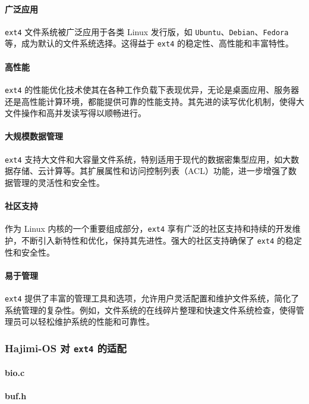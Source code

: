 \documentclass[UTF8]{article}
\begin{document}
\paragraph{广泛应用}
\texttt{ext4} 文件系统被广泛应用于各类 Linux 发行版，如 \texttt{Ubuntu}、\texttt{Debian}、\texttt{Fedora} 等，成为默认的文件系统选择。这得益于 \texttt{ext4} 的稳定性、高性能和丰富特性。

\paragraph{高性能}
\texttt{ext4} 的性能优化技术使其在各种工作负载下表现优异，无论是桌面应用、服务器还是高性能计算环境，都能提供可靠的性能支持。其先进的读写优化机制，使得大文件操作和高并发读写得以顺畅进行。

\paragraph{大规模数据管理}
\texttt{ext4} 支持大文件和大容量文件系统，特别适用于现代的数据密集型应用，如大数据存储、云计算等。其扩展属性和访问控制列表（ACL）功能，进一步增强了数据管理的灵活性和安全性。

\paragraph{社区支持}
作为 Linux 内核的一个重要组成部分，\texttt{ext4} 享有广泛的社区支持和持续的开发维护，不断引入新特性和优化，保持其先进性。强大的社区支持确保了 \texttt{ext4} 的稳定性和安全性。

\paragraph{易于管理}
\texttt{ext4} 提供了丰富的管理工具和选项，允许用户灵活配置和维护文件系统，简化了系统管理的复杂性。例如，文件系统的在线碎片整理和快速文件系统检查，使得管理员可以轻松维护系统的性能和可靠性。

\subsubsection{Hajimi-OS 对 \texttt{ext4} 的适配}
\paragraph{bio.c\\}

\paragraph{buf.h\\}
\end{document}
